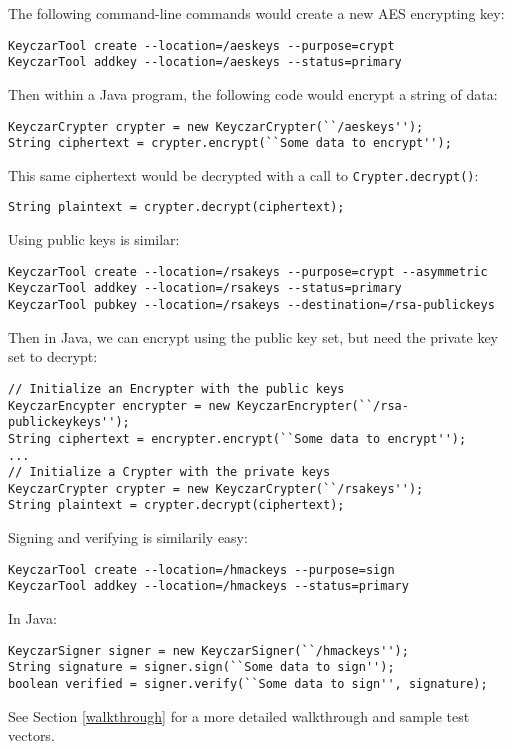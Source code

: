\documentclass{llncs}
\begin{document}
The following command-line commands would create a new AES encrypting key:
\begin{verbatim}
KeyczarTool create --location=/aeskeys --purpose=crypt
KeyczarTool addkey --location=/aeskeys --status=primary
\end{verbatim}

Then within a Java program, the following code would encrypt a string of data:
\begin{verbatim}
KeyczarCrypter crypter = new KeyczarCrypter(``/aeskeys'');
String ciphertext = crypter.encrypt(``Some data to encrypt'');
\end{verbatim}

This same ciphertext would be decrypted with a call to {\tt Crypter.decrypt()}:
\begin{verbatim}
String plaintext = crypter.decrypt(ciphertext);
\end{verbatim}

Using public keys is similar:
\begin{verbatim}
KeyczarTool create --location=/rsakeys --purpose=crypt --asymmetric
KeyczarTool addkey --location=/rsakeys --status=primary
KeyczarTool pubkey --location=/rsakeys --destination=/rsa-publickeys
\end{verbatim}

Then in Java, we can encrypt using the public key set, but need the private key
set to decrypt:
\begin{verbatim}
// Initialize an Encrypter with the public keys
KeyczarEncypter encrypter = new KeyczarEncrypter(``/rsa-publickeykeys'');
String ciphertext = encrypter.encrypt(``Some data to encrypt'');
... 
// Initialize a Crypter with the private keys
KeyczarCrypter crypter = new KeyczarCrypter(``/rsakeys'');
String plaintext = crypter.decrypt(ciphertext);
\end{verbatim}

Signing and verifying is similarily easy:
\begin{verbatim}
KeyczarTool create --location=/hmackeys --purpose=sign
KeyczarTool addkey --location=/hmackeys --status=primary
\end{verbatim}

In Java:
\begin{verbatim}
KeyczarSigner signer = new KeyczarSigner(``/hmackeys'');
String signature = signer.sign(``Some data to sign'');
boolean verified = signer.verify(``Some data to sign'', signature);
\end{verbatim}

See Section \ref{walkthrough} for a more detailed walkthrough and sample test
vectors.
\end{document}
